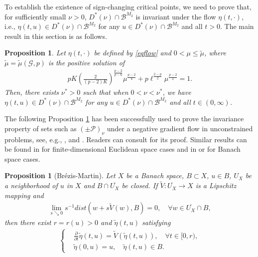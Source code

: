 \documentclass[10pt,a4paper]{article}
\newtheorem{proposition}[theorem]{Proposition}
\theoremstyle{definition} \theoremstyle{remark}
\numberwithin{equation}{section}
\newcommand{\G}{\mathcal{G}}
\newcommand{\B}{\mathcal{B}}
\newcommand{\p}{\mathcal{P}}
\begin{document}
To establish the existence of sign-changing critical points, we need to prove that, for sufficiently small $\nu > 0$, $D^*(\nu) \cap \B^{M_2}$ is invariant under the flow $\eta(t,\cdot)$, i.e., $\eta(t,u) \in D^*(\nu) \cap \B^{M_2}$ for any $u \in D^*(\nu) \cap \B^{M_2}$ and all $t > 0$. The main result in this section is as follows.

\begin{proposition} \label{propinva}
	Let $\eta(t,\cdot)$ be defined by \eqref{eqflow} and $0 < \mu \leq \tilde{\mu}$, where $\tilde{\mu} = \tilde{\mu}(\G,p)$ is the positive solution of 
	\begin{align*}
		pK\left( \frac2{(p-2)K}\right)^{\frac{p-2}{p-6}}\mu^{\frac{p-2}4} + p\ell^{\frac{2-p}2}\mu^{\frac{p-2}2} = 1.
	\end{align*}
	Then, there exists $\nu^* > 0$ such that when $0 < \nu < \nu^*$, we have $\eta(t,u) \in D^*(\nu) \cap \B^{M_2}$ for any $u \in D^*(\nu) \cap \B^{M_2}$ and all $t \in (0,\infty)$.
\end{proposition}


The following Proposition \ref{propbm} has been successfully used to prove the invariance property of sets such as $(\pm \p)_\nu$ under a negative gradient flow in unconstrained problems, see, e.g., \cite[Section 2]{SchZ1}, \cite[Section 2]{SchZ} and \cite[Lemma 2.3]{ZZ}. Readers can consult \cite[Theorem 4.1]{Dei} for its proof. Similar results can be found in \cite[Theorem 1]{Bre} for finite-dimensional Euclidean space cases and in \cite[Theorem 3]{Mar1} or \cite{Mar} for Banach space cases.
\medskip

\begin{proposition}[Br\'ezis-Martin] \label{propbm}
	Let $X$ be a Banach space, $B \subset X$, $u \in B$, $U_X$ be a neighborhood of $u$ in $X$ and $B \cap \overline{U_X}$ be closed. If $\widetilde V: \overline{U_X} \to X$ is a Lipschitz mapping and
	\begin{align} \label{eqd=0banachcase}
		\lim_{s \searrow 0}s^{-1}dist(w + s\widetilde V(w),B) = 0, \quad \forall w \in \overline{U_X} \cap B,
	\end{align}
	then there exist $r = r(u) > 0$ and $\tilde\eta(t,u)$ satisfying
	\begin{align*}
		\left\{
		\begin{aligned}
			& \frac{\partial}{\partial t}\tilde\eta(t,u) = \widetilde V(\tilde\eta(t,u)), \quad \forall t \in [0,r), \\
			& \tilde\eta(0,u) = u, \quad \tilde\eta(t,u) \in B.
		\end{aligned}
		\right.
	\end{align*}
\end{proposition}
\end{document}
